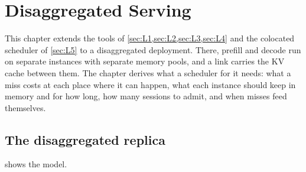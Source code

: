\chapter{Disaggregated Serving}\label{sec:L6}

This chapter extends the tools of \cref{sec:L1,sec:L2,sec:L3,sec:L4} and the colocated
scheduler of \cref{sec:L5} to a disaggregated deployment. There, prefill and decode run
on separate instances with separate memory pools, and a link carries the KV cache
between them. The chapter derives what a scheduler for it needs: what a miss costs at
each place where it can happen, what each instance should keep in memory and for how
long, how many sessions to admit, and when misses feed themselves.

\section{The disaggregated replica}\label{L6:sec:model}

 shows the model.

